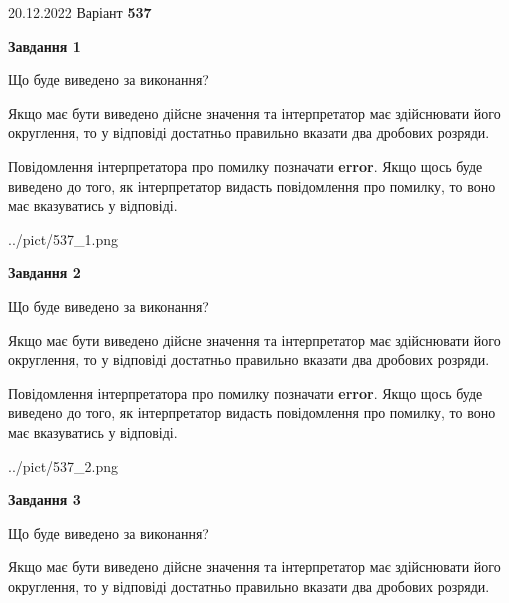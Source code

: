 \documentclass[12pt, ukrainian]{article}
\begin{document}
{20.12.2022 Варіант \No \textbf { 537 }\par}
{
\begin {Large}

{\begin {center}\textbf{Завдання 1}\end {center}}\par
Що буде виведено за виконання? \par

Якщо має бути виведено дійсне значення та інтерпретатор має здійснювати його округлення, 
то у відповіді достатньо правильно вказати два дробових розряди.

Повідомлення інтерпретатора про помилку позначати \textbf{error}.
Якщо щось буде виведено до того, як інтерпретатор видасть повідомлення про помилку, 
то воно має вказуватись у відповіді. \par

\begin{center}
	{../pict/537_1.png}
\end{center}
\newpage

{\begin {center}\textbf{Завдання 2}\end {center}}\par
Що буде виведено за виконання? \par

Якщо має бути виведено дійсне значення та інтерпретатор має здійснювати його округлення, 
то у відповіді достатньо правильно вказати два дробових розряди.

Повідомлення інтерпретатора про помилку позначати \textbf{error}.
Якщо щось буде виведено до того, як інтерпретатор видасть повідомлення про помилку, 
то воно має вказуватись у відповіді. \par

\begin{center}
	{../pict/537_2.png}
\end{center}
\newpage

{\begin {center}\textbf{Завдання 3}\end {center}}\par
Що буде виведено за виконання? \par

Якщо має бути виведено дійсне значення та інтерпретатор має здійснювати його округлення, 
то у відповіді достатньо правильно вказати два дробових розряди.


\end{Large}}
\end{document}
